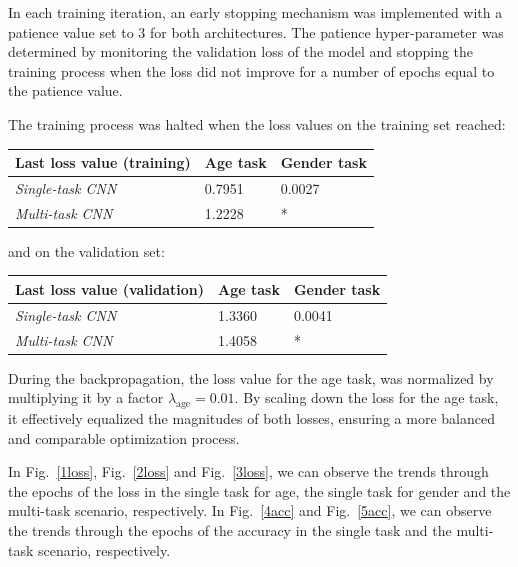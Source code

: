 In each training iteration, an early stopping mechanism was implemented with
a patience value set to 3 for both architectures.
The patience hyper-parameter was determined by monitoring the validation loss
of the model and stopping the training process when the loss
did not improve for a number of epochs equal to the patience value.

The training process was halted when the loss values
on the training set reached: 
\begin{table}[H]
    \centering
    \begin{tabular}{@{}lll@{}}
    \toprule
    Last loss value (training) & \textbf{Age task} & \textbf{Gender task} \\ \midrule
    \textit{Single-task CNN} &  0.7951           & 0.0027               \\
    \textit{Multi-task CNN}  &  1.2228           & *                    \\ \bottomrule
    \end{tabular}
\end{table}
and on the validation set:
\begin{table}[H]
    \centering
    \begin{tabular}{@{}lll@{}}
    \toprule
    Last loss value (validation) & \textbf{Age task} & \textbf{Gender task} \\ \midrule
    \textit{Single-task CNN} &  1.3360           & 0.0041               \\
    \textit{Multi-task CNN}  &  1.4058           & *                    \\ \bottomrule
    \end{tabular}
\end{table}
During the backpropagation, the loss value for the age task, 
was normalized by multiplying it by a factor
$\lambda_{\text{age}} = 0.01$.
By scaling down the loss for the age task, it effectively equalized
the magnitudes of both losses, ensuring a more balanced and comparable
optimization process. 

In Fig.~\ref{1loss}, Fig.~\ref{2loss} and Fig.~\ref{3loss},
we can observe the trends through the epochs
of the loss
in the single task for age, the single task for gender
and the multi-task scenario, respectively.
In Fig.~\ref{4acc} and Fig.~\ref{5acc}, we can observe the
trends through the epochs of the accuracy
in the single task
and the multi-task scenario, respectively.

